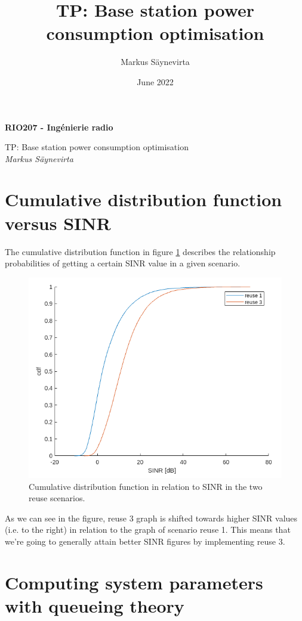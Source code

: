\documentclass{article}
\title{TP: Base station power consumption optimisation}
\author{Markus Säynevirta}
\date{June 2022}
\begin{document}
\thispagestyle{plain}

\large
\textbf{RIO207 - Ingénierie radio}

\large
TP: Base station power consumption optimisation\\
\textit{Markus Säynevirta}
\vspace{0.5cm}

\section{Cumulative distribution function versus SINR}
The cumulative distribution function in figure \ref{fig:q1_sinr_vs_cdf} describes the relationship probabilities of getting a certain SINR value in a given scenario.

\begin{figure}[!htb]
    \centering
    \includegraphics[width=12cm]{images/q1_sinr_vs_cdf.png}
    \caption{Cumulative distribution function in relation to SINR in the two reuse scenarios.}
    \label{fig:q1_sinr_vs_cdf}
\end{figure}

As we can see in the figure, reuse 3 graph is shifted towards higher SINR values (i.e. to the right) in relation to the graph of scenario reuse 1. This means that we're going to generally attain better SINR figures by implementing reuse 3.

\section{Computing system parameters with queueing theory}
\label{processor_sharing}
\end{document}
